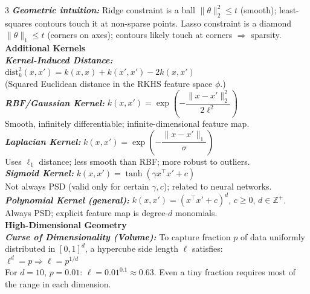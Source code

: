 \documentclass[a4paper,7pt]{article}
\begin{document}
\begin{multicols*}{3}
\textit{\textbf{Geometric intuition:}} Ridge constraint is a ball $\|\theta\|_2^2\leq t$ (smooth); least-squares contours touch it at non-sparse points. Lasso constraint is a diamond $\|\theta\|_1\leq t$ (corners on axes); contours likely touch at corners $\Rightarrow$ sparsity.\\

\textbf{Additional Kernels}\\

\textit{\textbf{Kernel-Induced Distance:}}\\
$\mathrm{dist}_k^2(x,x')=k(x,x)+k(x',x')-2k(x,x')$\\
(Squared Euclidean distance in the RKHS feature space $\phi$.)\\

\textit{\textbf{RBF/Gaussian Kernel:}} $k(x,x')=\exp\!\left(-\dfrac{\|x-x'\|_2^2}{2\ell^2}\right)$\\
Smooth, infinitely differentiable; infinite-dimensional feature map.\\

\textit{\textbf{Laplacian Kernel:}} $k(x,x')=\exp\!\left(-\dfrac{\|x-x'\|_1}{\sigma}\right)$\\
Uses $\ell_1$ distance; less smooth than RBF; more robust to outliers.\\

\textit{\textbf{Sigmoid Kernel:}} $k(x,x')=\tanh(\gamma x^\top x'+c)$\\
Not always PSD (valid only for certain $\gamma,c$); related to neural networks.\\

\textit{\textbf{Polynomial Kernel (general):}} $k(x,x')=(x^\top x'+c)^d$, $c\geq 0$, $d\in\mathbb{Z}^+$. Always PSD; explicit feature map is degree-$d$ monomials.\\

\textbf{High-Dimensional Geometry}\\

\textit{\textbf{Curse of Dimensionality (Volume):}} To capture fraction $p$ of data uniformly distributed in $[0,1]^d$, a hypercube side length $\ell$ satisfies:\\
$\ell^d=p\Rightarrow\ell=p^{1/d}$\\
For $d=10$, $p=0.01$: $\ell=0.01^{0.1}\approx0.63$. Even a tiny fraction requires most of the range in each dimension.\\


\end{multicols*}
\end{document}
